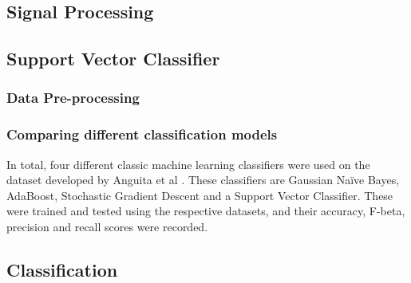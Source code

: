 \subsection{Signal Processing}

\subsection{Support Vector Classifier}
    \subsubsection{Data Pre-processing}
        

    \subsubsection{Comparing different classification models}
        In total, four different classic machine learning classifiers were used on the dataset developed by Anguita et al \cite{Anguita2012}. These classifiers are Gaussian Naïve Bayes,
        AdaBoost, Stochastic Gradient Descent and a Support Vector Classifier. These were trained and tested using the respective datasets, and their accuracy,
        F-beta, precision and recall scores were recorded.

    \subsection{Classification}